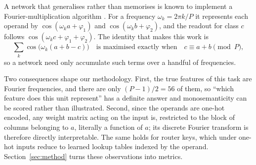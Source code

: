 A network that generalises rather than memorises is known to implement a
Fourier-multiplication algorithm \citep{nanda2023progress,bussmann2023modadd}.
For a frequency $\omega_k = 2\pi k / P$ it represents each operand by
$\cos(\omega_k a + \varphi_1)$ and $\cos(\omega_k b + \varphi_2)$, and the
readout for class $c$ follows $\cos(\omega_k c + \varphi_1 + \varphi_2)$. The
identity that makes this work is
\begin{equation}
  \sum_{k} \cos\!\big(\omega_k (a + b - c)\big)
  \quad\text{is maximised exactly when}\quad c \equiv a + b \pmod P,
\end{equation}
so a network need only accumulate such terms over a handful of frequencies.

Two consequences shape our methodology. First, the true features of this task
are Fourier frequencies, and there are only $(P-1)/2 = 56$ of them, so
``which feature does this unit represent'' has a definite answer and
monosemanticity can be scored rather than illustrated. Second, since the
operands are one-hot encoded, any weight matrix acting on the input is,
restricted to the block of columns belonging to $a$, literally a function of
$a$; its discrete Fourier transform is therefore directly interpretable. The
same holds for router keys, which under one-hot inputs reduce to learned
lookup tables indexed by the operand. Section~\ref{sec:method} turns these
observations into metrics.
